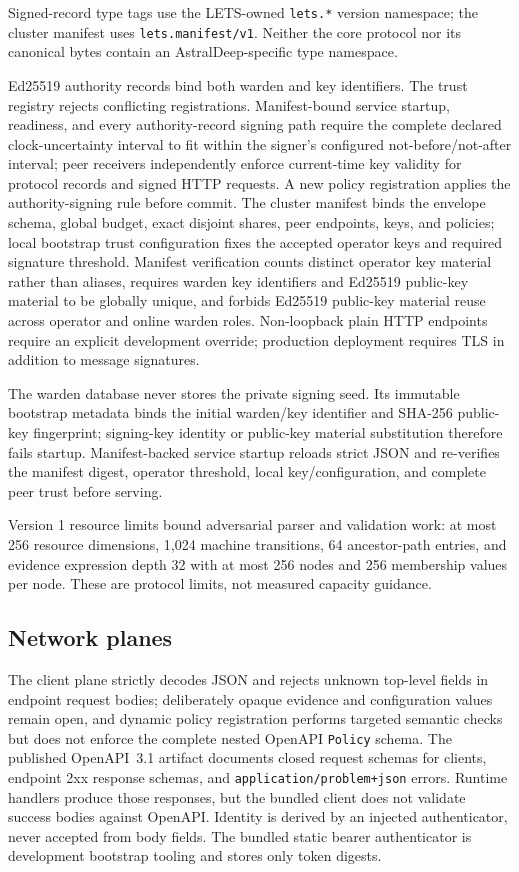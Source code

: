 \documentclass[10pt]{article}
\newcommand{\code}[1]{\nolinkurl{#1}}
\begin{document}
Signed-record type tags use the LETS-owned \code{lets.*} version namespace; the cluster manifest
uses \code{lets.manifest/v1}. Neither the core protocol nor its canonical bytes contain an
AstralDeep-specific type namespace.

Ed25519 authority records bind both warden and key identifiers. The trust registry rejects
conflicting registrations. Manifest-bound service startup, readiness, and every authority-record
signing path require the complete declared clock-uncertainty interval to fit within the signer's
configured not-before/not-after interval; peer receivers independently enforce current-time key
validity for protocol records and signed HTTP requests. A new policy registration applies the
authority-signing rule before commit. The cluster manifest
binds the envelope schema, global budget, exact disjoint shares, peer endpoints, keys, and policies;
local bootstrap trust configuration fixes the accepted operator keys and required signature
threshold. Manifest verification counts distinct operator key material rather than aliases, requires
warden key identifiers and Ed25519 public-key material to be globally unique, and forbids Ed25519
public-key material reuse across operator and online warden roles. Non-loopback plain HTTP endpoints
require an explicit development override;
production deployment requires TLS in addition to message signatures.

The warden database never stores the private signing seed. Its immutable bootstrap metadata binds
the initial warden/key identifier and SHA-256 public-key fingerprint; signing-key identity or
public-key material substitution therefore fails startup. Manifest-backed service startup reloads
strict JSON and re-verifies the manifest
digest, operator threshold, local key/configuration, and complete peer trust before serving.

Version 1 resource limits bound adversarial parser and validation work: at most 256 resource
dimensions, 1,024 machine transitions, 64 ancestor-path entries, and evidence expression depth 32
with at most 256 nodes and 256 membership values per node. These are protocol limits, not measured
capacity guidance.

\subsection{Network planes}

The client plane strictly decodes JSON and rejects unknown top-level fields in endpoint request
bodies; deliberately opaque evidence and configuration values remain open, and dynamic policy
registration performs targeted semantic checks but does not enforce the complete nested OpenAPI
\code{Policy} schema. The published OpenAPI~3.1 artifact documents closed request schemas for clients,
endpoint 2xx response schemas, and \code{application/problem+json} errors. Runtime handlers produce
those responses, but the bundled client does not validate success bodies against OpenAPI. Identity
is derived by an injected authenticator, never accepted from body fields. The
bundled static bearer authenticator is development bootstrap tooling and stores only token digests.
\end{document}
